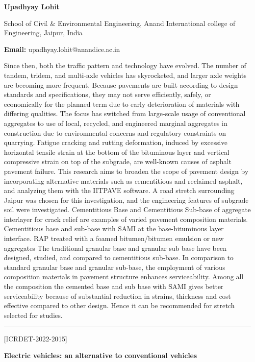 \documentclass[twoside,11pt]{amsart}
\begin{document}
\centerline{\textbf{Upadhyay Lohit}}
\vskip 5mm
\begin{flushleft}
School of Civil \& Environmental Engineering, Anand International college of Engineering, Jaipur, India
\vskip 5mm
\end{flushleft}
\vskip 2mm
\begin{flushleft}
{\bf Email:} upadhyay.lohit@anandice.ac.in
\end{flushleft}
\vskip 5mm
Since then, both the traffic pattern and technology have evolved. The number of tandem, tridem, and multi-axle vehicles has skyrocketed, and larger axle weights are becoming more frequent. Because pavements are built according to design standards and specifications, they may not serve efficiently, safely, or economically for the planned term due to early deterioration of materials with differing qualities.
\vskip 2mm
\newpage
\vskip 2mm
The focus has switched from large-scale usage of conventional aggregates to use of local, recycled, and engineered marginal aggregates in construction due to environmental concerns and regulatory constraints on quarrying. Fatigue cracking and rutting deformation, induced by excessive horizontal tensile strain at the bottom of the bituminous layer and vertical compressive strain on top of the subgrade, are well-known causes of asphalt pavement failure. This research aims to broaden the scope of pavement design by incorporating alternative materials such as cementitious and reclaimed asphalt, and analyzing them with the IITPAVE software. A road stretch surrounding Jaipur was chosen for this investigation, and the engineering features of subgrade soil were investigated. Cementitious Base and Cementitious Sub-base of aggregate interlayer for crack relief are examples of varied pavement composition materials. Cementitious base and sub-base with SAMI at the base-bituminous layer interface. RAP treated with a foamed bitumen/bitumen emulsion or new aggregates The traditional granular base and granular sub base have been designed, studied, and compared to cementitious sub-base. In comparison to standard granular base and granular sub-base, the employment of various composition materials in pavement structure enhances serviceability. Among all the composition the cemented base and sub base with SAMI gives better serviceability because of substantial reduction in strains, thickness and cost effective compared to other design. Hence it can be recommended for stretch selected for studies.
\vskip 2mm
\rule{\textwidth}{0.5pt}
\vskip 5mm
\begin{flushleft}
\centerline{[ICRDET-2022-2015]}
\end{flushleft}
\begin{center}\bf\LARGE
Electric vehicles: an alternative to conventional vehicles
\end{center}
\vskip 5mm
\end{document}
